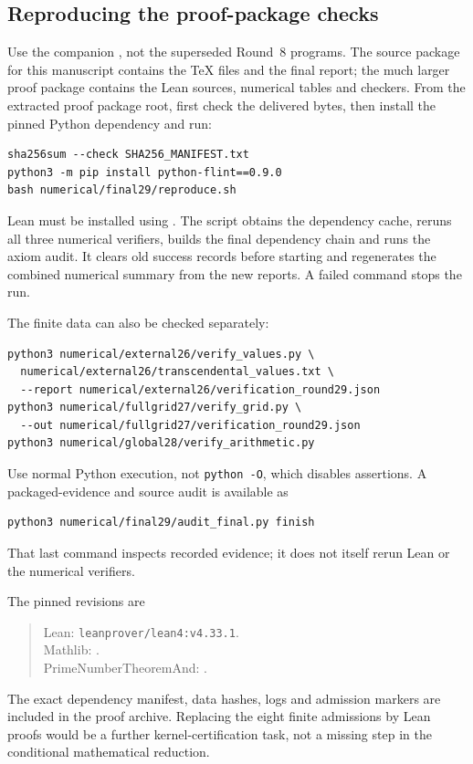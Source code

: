 \subsection{Reproducing the proof-package checks}
Use the companion , not the superseded
Round~8 programs. The source package for this manuscript contains the TeX
files and the final report; the much larger proof package contains the
Lean sources, numerical tables and checkers. From the extracted proof
package root, first check the delivered bytes, then install the pinned
Python dependency and run:
\begin{verbatim}
sha256sum --check SHA256_MANIFEST.txt
python3 -m pip install python-flint==0.9.0
bash numerical/final29/reproduce.sh
\end{verbatim}
Lean must be installed using . The script obtains
the dependency cache, reruns all three numerical verifiers, builds the
final dependency chain and runs the axiom audit. It clears old success
records before starting and regenerates the combined numerical summary
from the new reports. A failed command stops the run.

The finite data can also be checked separately:
\begin{verbatim}
python3 numerical/external26/verify_values.py \
  numerical/external26/transcendental_values.txt \
  --report numerical/external26/verification_round29.json
python3 numerical/fullgrid27/verify_grid.py \
  --out numerical/fullgrid27/verification_round29.json
python3 numerical/global28/verify_arithmetic.py
\end{verbatim}
Use normal Python execution, not \texttt{python -O}, which disables
assertions. A packaged-evidence and source audit is available as
\begin{verbatim}
python3 numerical/final29/audit_final.py finish
\end{verbatim}
That last command inspects recorded evidence; it does not itself rerun
Lean or the numerical verifiers.

The pinned revisions are
\begin{quote}\small
Lean: \texttt{leanprover/lean4:v4.33.1}.\\
Mathlib: .\\
PrimeNumberTheoremAnd:
.
\end{quote}
The exact dependency manifest, data hashes, logs and admission markers are
included in the proof archive. Replacing the eight finite admissions by
Lean proofs would be a further kernel-certification task, not a missing
step in the conditional mathematical reduction.

